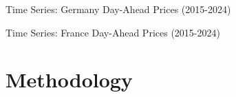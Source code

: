 \documentclass[aspectratio=169]{beamer}
\begin{document}
\begin{frame}{Time Series: Germany Day-Ahead Prices (2015-2024)}
\begin{center}

\end{center}
\end{frame}

\begin{frame}{Time Series: France Day-Ahead Prices (2015-2024)}
\begin{center}

\end{center}
\end{frame}

\section{Methodology}
\end{document}
